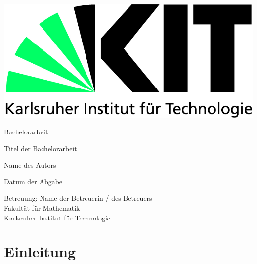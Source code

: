 \documentclass[12pt,a4paper]{scrartcl}
\numberwithin{equation}{section}
\begin{document}
  \pagestyle{empty}

  \begin{titlepage}

    \includegraphics[scale=0.45]{kit-logo.jpg} 
    \vspace*{2cm} 

 \begin{center} \large 
    
    Bachelorarbeit
    \vspace*{2cm}

    {\huge Titel der Bachelorarbeit}
    \vspace*{2.5cm}

    Name des Autors
    \vspace*{1.5cm}

    Datum der Abgabe
    \vspace*{4.5cm}


    Betreuung: Name der Betreuerin / des Betreuers \\[1cm]
    Fakultät für Mathematik \\[1cm]
		Karlsruher Institut für Technologie
  \end{center}
\end{titlepage}



  \tableofcontents

\newpage
 


  \pagestyle{headings}

\section{Einleitung}



 \newpage  %
 
\end{document}
